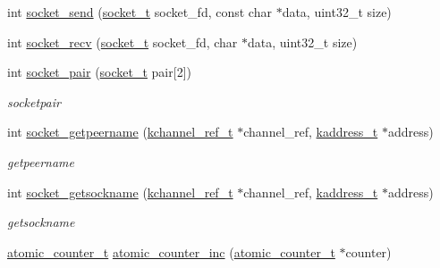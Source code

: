 \begin{DoxyCompactItemize}
int \hyperlink{a00099_a1acbefba637d7c0c3fd77355f84d4c22_a1acbefba637d7c0c3fd77355f84d4c22}{socket\+\_\+send} (\hyperlink{a00066_a0d9e0afbf02fb6ed6c5b1415dce51b05_a0d9e0afbf02fb6ed6c5b1415dce51b05}{socket\+\_\+t} socket\+\_\+fd, const char $\ast$data, uint32\+\_\+t size)
\item 
int \hyperlink{a00099_a8a4b901f1586de59d1d0a88d3326c934_a8a4b901f1586de59d1d0a88d3326c934}{socket\+\_\+recv} (\hyperlink{a00066_a0d9e0afbf02fb6ed6c5b1415dce51b05_a0d9e0afbf02fb6ed6c5b1415dce51b05}{socket\+\_\+t} socket\+\_\+fd, char $\ast$data, uint32\+\_\+t size)
\item 
int \hyperlink{a00099_a64d681185ca861b010c81db7479e9e08_a64d681185ca861b010c81db7479e9e08}{socket\+\_\+pair} (\hyperlink{a00066_a0d9e0afbf02fb6ed6c5b1415dce51b05_a0d9e0afbf02fb6ed6c5b1415dce51b05}{socket\+\_\+t} pair\mbox{[}2\mbox{]})
\begin{DoxyCompactList}\small\item\em socketpair \end{DoxyCompactList}\item 
int \hyperlink{a00099_a644c735078e8cc74601a1ea5cc52a430_a644c735078e8cc74601a1ea5cc52a430}{socket\+\_\+getpeername} (\hyperlink{a00066_a3b7e82599367eade261456f60ebe2cd9_a3b7e82599367eade261456f60ebe2cd9}{kchannel\+\_\+ref\+\_\+t} $\ast$channel\+\_\+ref, \hyperlink{a00066_a44e99fab0348ec54cfee119ddd9ceed6_a44e99fab0348ec54cfee119ddd9ceed6}{kaddress\+\_\+t} $\ast$address)
\begin{DoxyCompactList}\small\item\em getpeername \end{DoxyCompactList}\item 
int \hyperlink{a00099_ae9d654d20270a5ee5db0c90334c08c38_ae9d654d20270a5ee5db0c90334c08c38}{socket\+\_\+getsockname} (\hyperlink{a00066_a3b7e82599367eade261456f60ebe2cd9_a3b7e82599367eade261456f60ebe2cd9}{kchannel\+\_\+ref\+\_\+t} $\ast$channel\+\_\+ref, \hyperlink{a00066_a44e99fab0348ec54cfee119ddd9ceed6_a44e99fab0348ec54cfee119ddd9ceed6}{kaddress\+\_\+t} $\ast$address)
\begin{DoxyCompactList}\small\item\em getsockname \end{DoxyCompactList}\item 
\hyperlink{a00066_a0d043bbb6b8db19fea54ab9271d352b6_a0d043bbb6b8db19fea54ab9271d352b6}{atomic\+\_\+counter\+\_\+t} \hyperlink{a00138_gade4f41f1cd519f2719b5114ce7801232_gade4f41f1cd519f2719b5114ce7801232}{atomic\+\_\+counter\+\_\+inc} (\hyperlink{a00066_a0d043bbb6b8db19fea54ab9271d352b6_a0d043bbb6b8db19fea54ab9271d352b6}{atomic\+\_\+counter\+\_\+t} $\ast$counter)

\end{DoxyCompactItemize}
